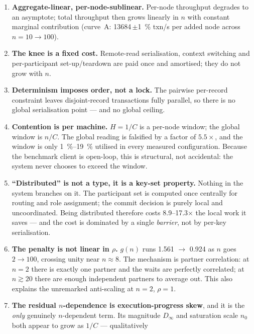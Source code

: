 \documentclass[11pt,a4paper]{article}
\newcommand{\hot}{C}
\newcommand{\gRatio}{g(n)}
\begin{document}
\begin{enumerate}[leftmargin=1.6em,itemsep=3pt]
\item \textbf{Aggregate-linear, per-node-sublinear.} Per-node throughput
      degrades to an asymptote; total throughput then grows linearly in $n$
      with constant marginal contribution (curve~A: \num{13684}\,$\pm$\SI{1}{\percent}
      txn/s per added node across $n=10\to100$).
\item \textbf{The knee is a fixed cost.} Remote-read serialisation, context
      switching and per-participant set-up/teardown are paid once and
      amortised; they do not grow with $n$.
\item \textbf{Determinism imposes order, not a lock.} The pairwise per-record
      constraint leaves disjoint-record transactions fully parallel, so there
      is no global serialisation point --- and no global ceiling.
\item \textbf{Contention is per machine.} $H = 1/\hot$ is a per-node window;
      the global window is $n/\hot$. The global reading is falsified by a
      factor of $5.5\times$, and the window is only \SI{1}{\percent}--\SI{19}{\percent}
      utilised in every measured configuration. Because the benchmark client is
      open-loop, this is structural, not accidental: the system never chooses to
      exceed the window.
\item \textbf{``Distributed'' is not a type, it is a key-set property.} Nothing
      in the system branches on it. The participant set is computed once
      centrally for routing and role assignment; the commit decision is purely
      local and uncoordinated. Being distributed therefore costs
      \num{8.9}--\num{17.3}$\times$ the local work it saves --- and the cost is
      dominated by a single \emph{barrier}, not by per-key serialisation.
\item \textbf{The penalty is not linear in $\rho$.} $\gRatio$ runs
      \num{1.561} $\to$ \num{0.924} as $n$ goes $2\to100$, crossing unity near
      $n\approx8$. The mechanism is partner correlation: at $n=2$ there is
      exactly one partner and the waits are perfectly correlated; at
      $n\gtrsim20$ there are enough independent partners to average out. This
      also explains the unremarked anti-scaling at $n=2$, $\rho=1$.
\item \textbf{The residual $n$-dependence is execution-progress skew}, and it is
      the \emph{only} genuinely $n$-dependent term. Its magnitude $D_\infty$ and
      saturation scale $n_0$ both appear to grow as $1/\hot$ --- qualitatively

\end{enumerate}
\end{document}
